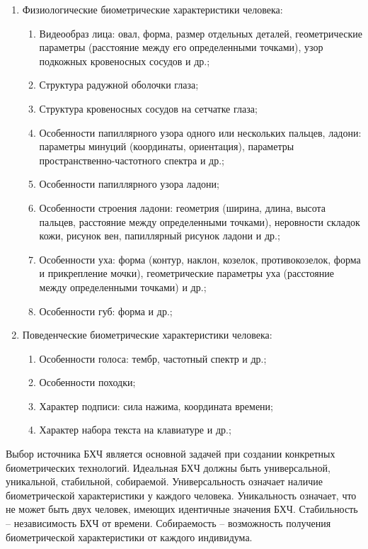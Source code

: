 \begin{enumerate}
	\setlength\itemsep{0.01em}
	\item Физиологические биометрические характеристики человека:
	\begin{enumerate}
		\item Видеообраз лица: овал, форма, размер отдельных деталей, геометрические параметры (расстояние между его определенными точками), узор подкожных кровеносных сосудов и др.;
		\item Структура радужной оболочки глаза;
		\item Структура кровеносных сосудов на сетчатке глаза;
		\item Особенности папиллярного узора одного или нескольких пальцев, ладони: параметры минуций (координаты, ориентация), параметры пространственно-частотного спектра и др.;
		\item Особенности папиллярного узора ладони;
		\item Особенности строения ладони: геометрия (ширина, длина, высота пальцев, расстояние между определенными точками), неровности складок кожи, рисунок вен, папиллярный рисунок ладони и др.;
		\item Особенности уха: форма (контур, наклон, козелок, противокозелок, форма и прикрепление мочки), геометрические параметры уха (расстояние между определенными точками) и др.;
		\item Особенности губ: форма и др.;
	\end{enumerate}
	\item Поведенческие биометрические характеристики человека:
	\begin{enumerate}
		\item Особенности голоса: тембр, частотный спектр и др.;
		\item Особенности походки;
		\item Характер подписи: сила нажима, координата времени;
		\item Характер набора текста на клавиатуре и др.;
	\end{enumerate}
\end{enumerate}

Выбор источника БХЧ является основной задачей при создании конкретных биометрических технологий. Идеальная БХЧ должны быть универсальной, уникальной, стабильной, собираемой. Универсальность означает наличие биометрической характеристики у каждого человека. Уникальность означает, что не может быть двух человек, имеющих идентичные значения БХЧ. Стабильность -- независимость БХЧ от времени. Собираемость -- возможность получения биометрической характеристики от каждого индивидума.


